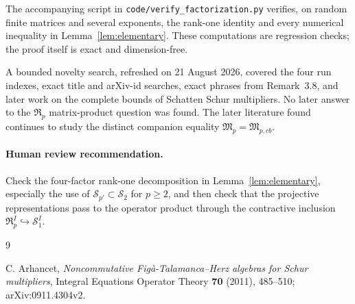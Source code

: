 \documentclass[11pt]{article}
\newcommand{\Rp}{\mathfrak R}
\newcommand{\Sp}{\mathcal S}
\begin{document}
The accompanying script in \texttt{code/verify\_factorization.py} verifies,
on random finite matrices and several
exponents, the rank-one identity and every numerical inequality in
Lemma~\ref{lem:elementary}.  These computations are regression checks; the
proof itself is exact and dimension-free.

A bounded novelty search, refreshed on 21 August 2026, covered the four run indexes,
exact title and arXiv-id searches, exact phrases from Remark~3.8, and later
work on the complete bounds of Schatten Schur multipliers.  No later answer
to the $\Rp_p$ matrix-product question was found.  The later literature found
continues to study the distinct companion equality
$\mathfrak M_p=\mathfrak M_{p,cb}$.

\paragraph{Human review recommendation.}
Check the four-factor rank-one decomposition in Lemma~\ref{lem:elementary},
especially the use of $\Sp_{p'}\subset\Sp_2$ for $p\geq2$, and then check
that the projective representations pass to the operator product through the
contractive inclusion $\Rp_p^I\hookrightarrow\Sp_1^I$.

\begin{thebibliography}{9}
\raggedright
{}
C. Arhancet,
\emph{Noncommutative Fig\`a-Talamanca--Herz algebras for Schur multipliers},
Integral Equations Operator Theory \textbf{70} (2011), 485--510;
arXiv:0911.4304v2.
\end{thebibliography}
\end{document}
